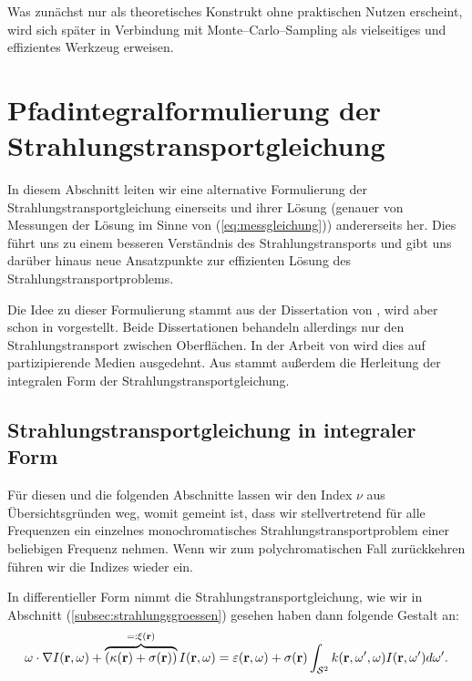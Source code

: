 	Was zunächst nur als theoretisches Konstrukt ohne praktischen Nutzen erscheint, wird sich später in Verbindung mit Monte--Carlo--Sampling als vielseitiges und effizientes Werkzeug erweisen.
	
	
		
	\chapter{Pfadintegralformulierung der Strahlungstransportgleichung}\label{chapter:path_radiative_transfer}
	In diesem Abschnitt leiten wir eine alternative Formulierung der Strahlungstransportgleichung einerseits und ihrer Lösung (genauer von Messungen der Lösung im Sinne von (\ref{eq:messgleichung})) andererseits her. Dies führt uns zu einem besseren Verständnis des Strahlungstransports und gibt uns darüber hinaus neue Ansatzpunkte zur effizienten Lösung des Strahlungstransportproblems.
	
	Die Idee zu dieser Formulierung stammt aus der Dissertation von \citet{Veach:1997p9136}, wird aber schon in \citep{Arvo:1995p9257} vorgestellt. Beide Dissertationen behandeln allerdings nur den Strahlungstransport zwischen Oberflächen. In der Arbeit von \citet{Pauly:2000p5705} wird dies auf partizipierende Medien ausgedehnt. Aus \citep{Arvo:1993p9035} stammt außerdem die Herleitung der integralen Form der Strahlungstransportgleichung.
	
	
	\section{Strahlungstransportgleichung in integraler Form}
	Für diesen und die folgenden Abschnitte lassen wir den Index $\nu$ aus Übersichtsgründen weg, womit gemeint ist, dass wir stellvertretend für alle Frequenzen ein einzelnes monochromatisches Strahlungstransportproblem einer beliebigen Frequenz nehmen. Wenn wir zum polychromatischen Fall zurückkehren führen wir die Indizes wieder ein.
	
	In differentieller Form nimmt die Strahlungstransportgleichung, wie wir in Abschnitt (\ref{subsec:strahlungsgroessen}) gesehen haben dann folgende Gestalt an:
		\begin{equation}
			\omega \cdot \nabla I(\mathbf{r},\omega)+\overbrace{\left(\kappa(\mathbf{r})+\sigma(\mathbf{r})\right)}^{=:\xi(\mathbf{r})}I(\mathbf{r},\omega)=\varepsilon(\mathbf{r},\omega)+\sigma(\mathbf{r}) \int_{\mathcal{S}^2} k(\mathbf{r},\omega',\omega)I(\mathbf{r},\omega') d\omega'.
			\label{eq:diff.STG}
		\end{equation}
	
